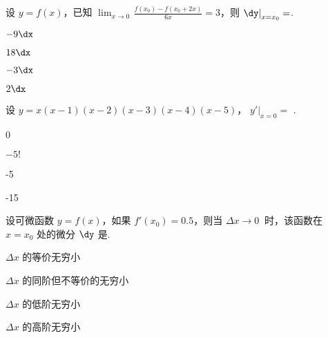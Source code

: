\begin{problem}设 $y = f(x)$，已知
$\displaystyle \lim_{x \rightarrow 0}\mspace{2mu}\frac{f\left( x_{0} \right) - f\left( x_{0} + 2x \right)}{6x} = 3$，则
${\dy|}_{x = x_{0}} =$.

\begin{abcd} 
\item $- 9\dx$

\item $18\dx$

\item $- 3\dx$

\item $2\dx$

\end{abcd}

\end{problem}           


\begin{problem}设 $\displaystyle y = x(x - 1)(x - 2)(x - 3)(x - 4)(x - 5)$， $\displaystyle {y'|}_{x = 0}=$
.

\begin{abcd} 
	
\item 0

\item $- 5!$

\item -5

\item -15

\end{abcd}

\end{problem}           

\begin{problem}设可微函数 $y = f(x)$，如果 $f'\left( x_{0} \right) = 0.5$，则当
$\Delta x \rightarrow 0\ $ 时，该函数在 $x = x_{0}$ 处的微分
${\dy}$ 是.

\begin{abcd} \item $\Delta x$ 的等价无穷小

\item $\Delta x$ 的同阶但不等价的无穷小

\item $\Delta x$ 的低阶无穷小

\item $\Delta x$ 的高阶无穷小

\end{abcd}


\end{problem}           


